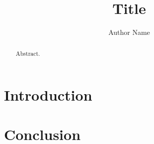 \documentclass[sigconf]{acmart}
\begin{document}
\title{Title}

\author{Author Name}

\begin{abstract}
Abstract.
\end{abstract}

\maketitle

\section{Introduction}

\section{Conclusion}
\end{document}
